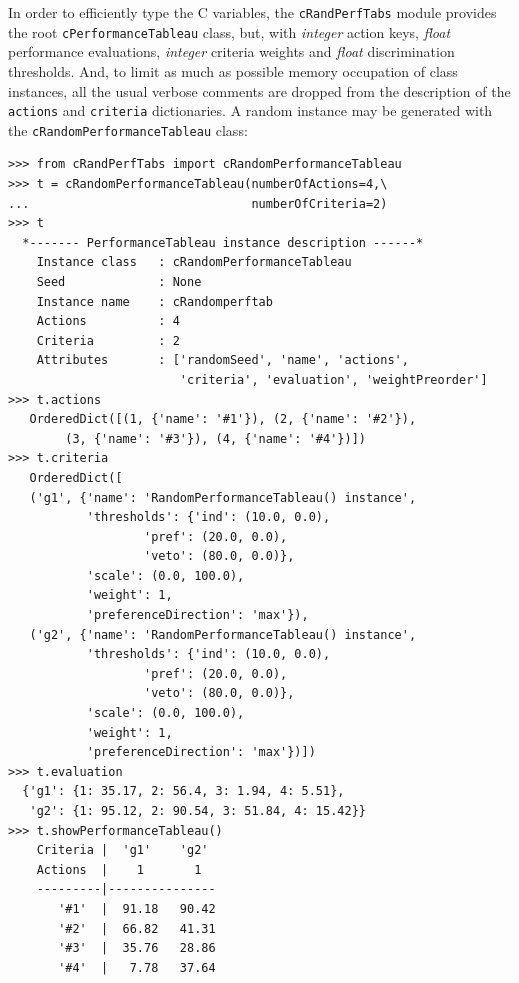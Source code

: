 In order to efficiently type the C variables, the \texttt{cRandPerfTabs} module provides the root \texttt{cPerformanceTableau} class, but, with \emph{integer} action keys, \emph{float} performance evaluations, \emph{integer} criteria weights and \emph{float} discrimination thresholds. And, to limit as much as possible memory occupation of class instances, all the usual verbose comments are dropped from the description of the \texttt{actions} and \texttt{criteria} dictionaries. A random instance may be generated with the  \texttt{cRandomPerformanceTableau} class:
\begin{lstlisting}[caption={Big data performance tableau format},label=list:11.1,basicstyle=\ttfamily\scriptsize]
>>> from cRandPerfTabs import cRandomPerformanceTableau
>>> t = cRandomPerformanceTableau(numberOfActions=4,\
...                               numberOfCriteria=2)
>>> t
  *------- PerformanceTableau instance description ------*
    Instance class   : cRandomPerformanceTableau
    Seed             : None
    Instance name    : cRandomperftab
    Actions          : 4
    Criteria         : 2
    Attributes       : ['randomSeed', 'name', 'actions',
                        'criteria', 'evaluation', 'weightPreorder']
>>> t.actions
   OrderedDict([(1, {'name': '#1'}), (2, {'name': '#2'}),
		(3, {'name': '#3'}), (4, {'name': '#4'})])
>>> t.criteria
   OrderedDict([
   ('g1', {'name': 'RandomPerformanceTableau() instance',
	       'thresholds': {'ind': (10.0, 0.0),
			       'pref': (20.0, 0.0),
			       'veto': (80.0, 0.0)},
	       'scale': (0.0, 100.0),
	       'weight': 1,
	       'preferenceDirection': 'max'}),
   ('g2', {'name': 'RandomPerformanceTableau() instance',
	       'thresholds': {'ind': (10.0, 0.0),
			       'pref': (20.0, 0.0),
			       'veto': (80.0, 0.0)},
	       'scale': (0.0, 100.0),
	       'weight': 1,
	       'preferenceDirection': 'max'})])
>>> t.evaluation
  {'g1': {1: 35.17, 2: 56.4, 3: 1.94, 4: 5.51},
   'g2': {1: 95.12, 2: 90.54, 3: 51.84, 4: 15.42}}
>>> t.showPerformanceTableau()
	Criteria |  'g1'    'g2'   
	Actions  |    1       1    
	---------|---------------
	   '#1'  |  91.18   90.42  
	   '#2'  |  66.82   41.31  
	   '#3'  |  35.76   28.86  
	   '#4'  |   7.78   37.64  
\end{lstlisting}

